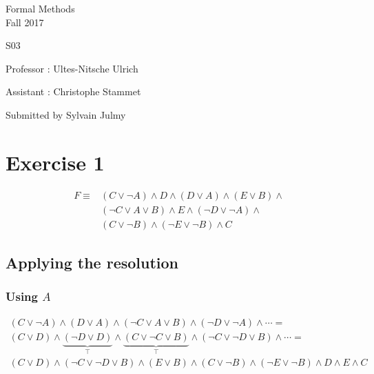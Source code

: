 \documentclass[a4paper,11pt]{report}
\author{Sylvain Julmy}
\date{\today}
\begin{document}
\begin{center}
  \large{
    Formal Methods\\
    Fall 2017
  }
  
  \noindent\makebox[\linewidth]{\rule{\linewidth}{0.4pt}}
  S03
  \noindent\makebox[\linewidth]{\rule{\linewidth}{0.4pt}}

  \begin{flushleft}
    Professor : Ultes-Nitsche Ulrich

    Assistant : Christophe Stammet
  \end{flushleft}

  
  \noindent\makebox[\linewidth]{\rule{\linewidth}{0.4pt}}

  Submitted by Sylvain Julmy
  
  \noindent\makebox[\linewidth]{\rule{\textwidth}{1pt}}
\end{center}

\section*{Exercise 1}

\begin{align*}
  F \equiv & (C \vee \neg A) \wedge D \wedge (D \vee A) \wedge (E \vee B) \wedge \\
           & (\neg C \vee A \vee B) \wedge E \wedge (\neg D \vee \neg A) \wedge \\
           & (C \vee \neg B) \wedge (\neg E \vee \neg B) \wedge C
\end{align*}

\subsection*{Applying the resolution}

\subsubsection*{Using $A$}

\begin{gather*}
  (C \vee \neg A) \wedge (D \vee A) \wedge (\neg C \vee A \vee B) \wedge (\neg D
  \vee \neg A) \wedge \cdots = \\
  (C \vee D) \wedge \underbrace{(\neg D \vee D)}_\top \wedge
  \underbrace{(C \vee \neg C \vee B)}_\top \wedge (\neg C \vee \neg D \vee B)
  \wedge \cdots = \\
  (C \vee D) \wedge (\neg C \vee \neg D \vee B) \wedge (E \vee B) \wedge (C \vee
  \neg B) \wedge (\neg E \vee \neg B) \wedge D \wedge E \wedge C
\end{gather*}
\end{document}
